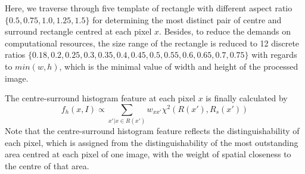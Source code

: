 \documentclass[10pt,twocolumn,letterpaper]{article}
\newcommand{\SUM}{\sum\limits}
\begin{document}
Here, we traverse through five template of rectangle with different aspect ratio $\{ 0.5, 0.75, 1.0, 1.25, 1.5\}$ for determining the most distinct pair of centre and surround rectangle centred at each pixel $x$. Besides, to reduce the demands on computational resources, the size range of the rectangle is reduced to 12 discrete ratios $\{ {0.18, 0.2, 0.25, 0.3, 0.35, 0.4, 0.45, 0.5, 0.55, 0.6, 0.65, 0.7, 0.75}\}$ with regards to  $min(w,h)$, which is the minimal value of width and height of the processed image.

The centre-surround histogram feature at each pixel $x$ is finally calculated by $$f_h(x,I)\propto\SUM_{x'|x\in R(x')}w_{xx'}\chi^2(R(x'),R_s(x'))$$
Note that the centre-surround histogram feature reflects the distinguishability of each pixel, which is assigned from the distinguishability of the most outstanding area centred at each pixel of one image, with the weight of spatial closeness to the centre of that area. 
\end{document}
